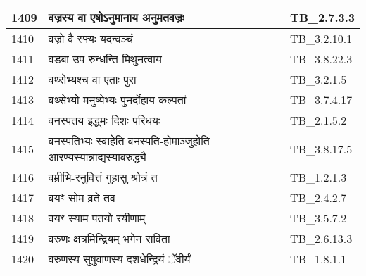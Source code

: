 \documentclass[17pt]{extarticle}
\begin{document}
\begin{longtable}{||p{0.4in}||p{4.9in}||p{0.9in}||}
    \hline
        
    1409 & वज्रस्य वा एषोऽनुमानाय अनुमतवज्रः & TB\_2.7.3.3       \\
    
    \hline
        
    1410 & वज्रो वै स्फ्यः यदन्वञ्चं & TB\_3.2.10.1       \\
    
    \hline
        
    1411 & वडबा उप रुन्धन्ति मिथुनत्वाय & TB\_3.8.22.3       \\
    
    \hline
        
    1412 & वथ्सेभ्यश्च वा एताः पुरा & TB\_3.2.1.5       \\
    
    \hline
        
    1413 & वथ्सेभ्यो मनुष्येभ्यः पुनर्दोहाय कल्पतां & TB\_3.7.4.17       \\
    
    \hline
        
    1414 & वनस्पतय इद्ध्मः दिशः परिधयः & TB\_2.1.5.2       \\
    
    \hline
        
    1415 & वनस्पतिभ्यः स्वाहेति वनस्पति{-}होमाञ्जुहोति आरण्यस्यान्नाद्यस्यावरुद्ध्यै & TB\_3.8.17.5       \\
    
    \hline
        
    1416 & वम्रीभि{-}रनुवित्तं गुहासु श्रोत्रं त & TB\_1.2.1.3       \\
    
    \hline
        
    1417 & वयꣳ सोम व्रते तव & TB\_2.4.2.7       \\
    
    \hline
        
    1418 & वयꣳ स्याम पतयो रयीणाम् & TB\_3.5.7.2       \\
    
    \hline
        
    1419 & वरुणः क्षत्रमिन्द्रियम् भगेन सविता & TB\_2.6.13.3       \\
    
    \hline
        
    1420 & वरुणस्य सुषुवाणस्य दशधेन्द्रियं ॅवीर्यं & TB\_1.8.1.1       \\
    
    \hline
        

\end{longtable}
\end{document}
